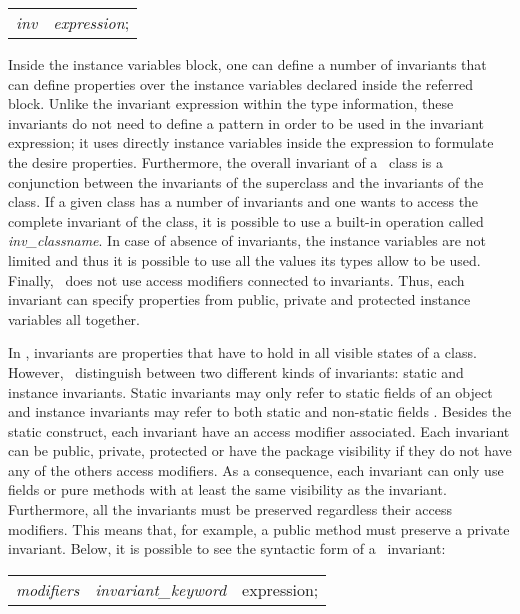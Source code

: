 \begin{center}
\begin{tabular}{ll}
\textit{inv} & \textit{expression};\\
\end{tabular}
\end{center}

Inside the instance variables block, one can define a number of invariants that can define properties over the instance variables declared inside the referred block. Unlike the invariant expression within the type information, these invariants do not need to define a pattern in order to be used in the invariant expression; it uses directly instance variables inside the expression to formulate the desire properties. Furthermore, the overall invariant of a \vpp\ class is a conjunction between the invariants of the superclass and the invariants of the class. If a given class has a number of invariants and one wants to access the complete invariant of the class, it is possible to use a built-in operation called \textit{inv\_classname}. In case of absence of invariants, the instance variables are not limited and thus it is possible to use all the values its types allow to be used. Finally, \vpp\ does not use access modifiers connected to invariants. Thus, each invariant can specify properties from public, private and protected instance variables all together. 

In \jml, invariants are properties that have to hold in all visible states \cite{leavens-etal07} of a class. However, \jml\ distinguish between two different kinds of invariants: static and instance invariants. Static invariants may only refer to static fields of an object and instance invariants may refer to both static and non-static fields \cite{leavens-etal07}. Besides the static construct, each invariant have an access modifier associated. Each invariant can be public, private, protected or have the package visibility if they do not have any of the others access modifiers. As a consequence, each invariant can only use fields or pure methods with at least the same visibility as the invariant. Furthermore, all the invariants must be preserved regardless their access modifiers. This means that, for example, a public method must preserve a private invariant. Below, it is possible to see the syntactic form of a \jml\ invariant:

\begin{center}
\begin{tabular}{lll}
\textit{modifiers} & \textit{invariant\_keyword} & expression;\\
\end{tabular}
\end{center}

